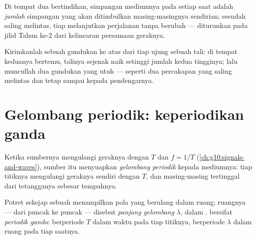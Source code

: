 \begin{proposition}\label{prop:g12:mechanical-waves:superposition}
Di tempat dua  bertindihan, simpangan mediumnya pada setiap
saat adalah \emph{jumlah} simpangan yang akan ditimbulkan
masing-masingnya sendirian; sesudah saling melintas, tiap 
melanjutkan perjalanan tanpa berubah --- diturunkan pada jilid Tahun
ke-2 dari kelinearan persamaan geraknya. \admitted
\end{proposition}

\begin{example}\label{ex:g12:mechanical-waves:crossing}
Kirimkanlah sebuah gundukan ke atas dari tiap ujung sebuah tali: di
tempat keduanya bertemu, talinya sejenak naik setinggi jumlah kedua
tingginya; lalu muncullah dua gundukan yang utuh --- seperti dua
percakapan yang saling melintas dan tetap sampai kepada pendengarnya.
\end{example}

\section{Gelombang periodik: keperiodikan ganda}

\begin{definition}\label{def:g12:mechanical-waves:periodic}
Ketika sumbernya mengulangi geraknya dengan  $T$ dan 
$f = 1/T$ (\cref{ch:g10:signals-and-waves}), sumber itu menyuapkan
\emph{gelombang periodik} kepada mediumnya:
tiap titiknya mengulangi geraknya sendiri dengan  $T$, dan
masing-masing tertinggal dari tetangganya sebesar  tempuhnya.
\end{definition}

\begin{definition}\label{def:g12:mechanical-waves:wavelength}
Potret sekejap sebuah  menampilkan pola yang berulang
dalam ruang;  ruangnya --- dari puncak ke puncak --- disebut
\emph{panjang gelombang} $\lambda$, dalam
.  bersifat \emph{periodik
ganda}: berperiode $T$ dalam waktu pada tiap
titiknya, berperiode $\lambda$ dalam ruang pada tiap saatnya.
\end{definition}

